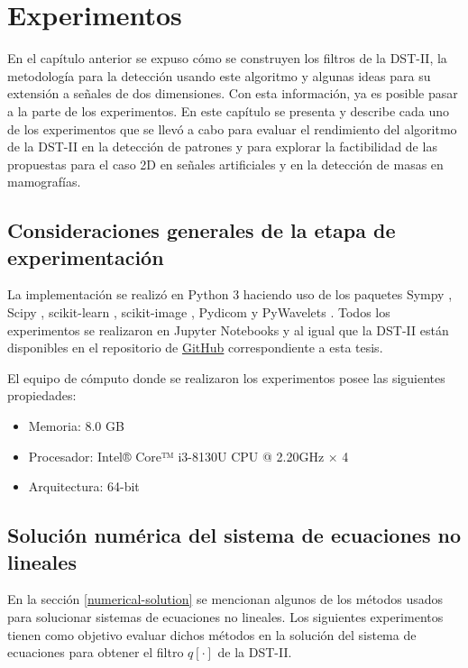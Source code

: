\chapter{Experimentos}\label{chapter:implementation}

En el capítulo anterior se expuso cómo se construyen los filtros de la DST-II, la metodología para
la detección usando este algoritmo y algunas ideas para su extensión a señales de dos dimensiones. Con esta información,
ya es posible pasar a la parte de los experimentos. 
En este capítulo se presenta y describe cada uno de los experimentos que se llevó a cabo para evaluar el rendimiento 
del algoritmo de la DST-II en la detección de patrones y para explorar la factibilidad de las propuestas
para el caso 2D en señales artificiales y en la detección de masas en mamografías.

\section{Consideraciones generales de la etapa de experimentación}

La implementación se realizó en Python 3 \cite{python3} haciendo uso de los paquetes Sympy \cite{10.7717/peerj-cs.103}, 
Scipy \cite{2020SciPy-NMeth}, scikit-learn \cite{sklearn_api}, scikit-image \cite{van2014scikit},
Pydicom \cite{darcy_mason_2020_4313150}
y PyWavelets \cite{Lee2019}. Todos los experimentos se 
realizaron en Jupyter Notebooks \cite{Kluyver2016jupyter} y al igual que la DST-II están disponibles en el repositorio de
\href{https://github.com/adrian13579/discrete-shapelet-transform}{GitHub} correspondiente a esta tesis.

El equipo de cómputo donde se realizaron los experimentos posee las siguientes propiedades:

\begin{itemize}
	\item Memoria: 8.0 GB
	\item Procesador: Intel® Core™ i3-8130U CPU @ 2.20GHz × 4
	\item Arquitectura: 64-bit
\end{itemize}


\section{Solución numérica del sistema de ecuaciones no lineales}

En la sección \ref{numerical-solution} se mencionan algunos de los métodos usados para solucionar sistemas de 
ecuaciones no lineales. Los siguientes experimentos tienen como objetivo evaluar dichos métodos en la solución
del sistema de ecuaciones para obtener el filtro $q[\cdot]$ de la DST-II.

